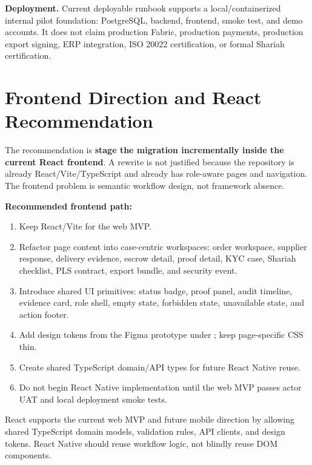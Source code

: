 \documentclass[conference]{IEEEtran}
\begin{document}
\textbf{Deployment.} Current deployable runbook supports a local/containerized internal pilot foundation: PostgreSQL, backend, frontend, smoke test, and demo accounts. It does not claim production Fabric, production payments, production export signing, ERP integration, ISO 20022 certification, or formal Shariah certification.

\section{Frontend Direction and React Recommendation}
The recommendation is \textbf{stage the migration incrementally inside the current React frontend}. A rewrite is not justified because the repository is already React/Vite/TypeScript and already has role-aware pages and navigation. The frontend problem is semantic workflow design, not framework absence.

\textbf{Recommended frontend path:}
\begin{enumerate}
  \item Keep React/Vite for the web MVP.
  \item Refactor page content into case-centric workspaces: order workspace, supplier response, delivery evidence, escrow detail, proof detail, KYC case, Shariah checklist, PLS contract, export bundle, and security event.
  \item Introduce shared UI primitives: status badge, proof panel, audit timeline, evidence card, role shell, empty state, forbidden state, unavailable state, and action footer.
  \item Add design tokens from the Figma prototype under ; keep page-specific CSS thin.
  \item Create shared TypeScript domain/API types for future React Native reuse.
  \item Do not begin React Native implementation until the web MVP passes actor UAT and local deployment smoke tests.
\end{enumerate}

React supports the current web MVP and future mobile direction by allowing shared TypeScript domain models, validation rules, API clients, and design tokens. React Native should reuse workflow logic, not blindly reuse DOM components.
\end{document}
